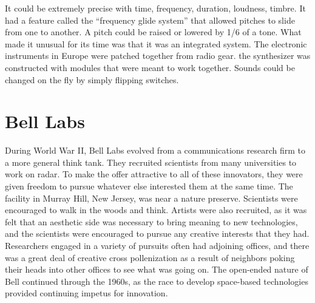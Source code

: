 It could be extremely precise with time, frequency, duration, loudness, timbre. It had a feature called the ``frequency glide system'' that allowed pitches to slide from one to another. A pitch could be raised or lowered by 1/6 of a tone. What made it unusual for its time was that it was an integrated system. The electronic instruments in Europe were patched together from radio gear. the synthesizer was constructed with modules that were meant to work together. Sounds could be changed on the fly by simply flipping switches.

\section{Bell Labs}

During World War II, Bell Labs evolved from a communications research firm to a more general think tank. They recruited scientists from many universities to work on radar. To make the offer attractive to all of these innovators, they were given freedom to pursue whatever else interested them at the same time. The facility in Murray Hill, New Jersey, was near a nature preserve. Scientists were encouraged to walk in the woods and think. Artists were also recruited, as it was felt that an aesthetic side was necessary to bring meaning to new technologies, and the scientists were encouraged to pursue any creative interests that they had. Researchers engaged in a variety of pursuits often had adjoining offices, and there was a great deal of creative cross pollenization as a result of neighbors poking their heads into other offices to see what was going on. The open-ended nature of Bell continued through the 1960s, as the race to develop space-based technologies provided continuing impetus for innovation.

